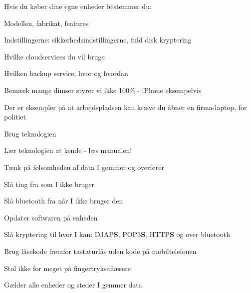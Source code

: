 \documentclass[20pt,landscape,a4paper,footrule]{foils}
\begin{document}





\begin{list1}
\item Hvis du køber dine egne enheder bestemmer du:
\item Modellen, fabrikat, features
\item Indstillingerne: sikkerhedsindstillingerne, fuld disk kryptering
\item Hvilke cloudservices du vil bruge
\item Hvilken backup service, hvor og hvordan
\end{list1}

\centerline{Bemærk mange dimser styrer vi ikke 100\% - iPhone eksempelvis}

Der er eksempler på at arbejdspladsen kan kræve du åbner en firma-laptop, for politiet


\begin{list1}

\item Brug teknologien
\item Lær teknologien at kende - læs manualen!
\item Tænk på følsomheden af data I gemmer og overfører
\begin{list2}
\item Slå ting fra som I ikke bruger
\item Slå bluetooth fra når I ikke bruger den
\item Opdater softwaren på enheden
\item Slå kryptering til hvor I kan: IMAP{\bf S}, POP3{\bf S},
  HTTP{\bf S} og over bluetooth
\item Brug låsekode fremfor tastaturlås uden kode på mobiltelefonen
\item Stol ikke for meget på fingertryksaflæsere
\end{list2}

\vskip 2cm
\centerline{\large Gælder alle enheder og steder I gemmer data}

\end{list1}
\end{document}
